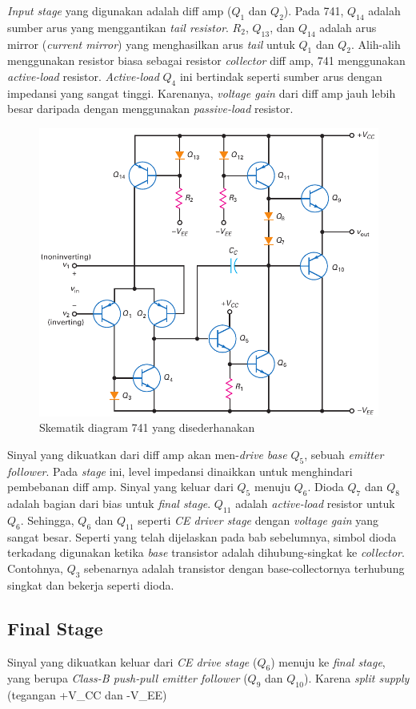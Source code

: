 \textit{Input stage} yang digunakan adalah diff amp ($ Q_1 $ dan $ Q_2 $). Pada 741, $ Q_{14} $ adalah sumber arus yang menggantikan \textit{tail resistor}. $ R_2 $, $ Q_{13} $, dan $ Q_{14} $ adalah arus mirror (\textit{current mirror}) yang menghasilkan arus \textit{tail} untuk $ Q_1 $ dan $ Q_2 $. Alih-alih menggunakan resistor biasa sebagai resistor \textit{collector} diff amp, 741 menggunakan \textit{active-load} resistor. \textit{Active-load} $ Q_4 $ ini bertindak seperti sumber arus dengan impedansi yang sangat tinggi. Karenanya, \textit{voltage gain} dari diff amp jauh lebih besar daripada dengan menggunakan \textit{passive-load} resistor.

\begin{figure}
	\centering
	\includegraphics[width=\linewidth]{pic/fig:16.04}
	\caption{Skematik diagram 741 yang disederhanakan}
	\label{fig:16.04}
\end{figure}

Sinyal yang dikuatkan dari diff amp akan men-\textit{drive} \textit{base} $ Q_5 $, sebuah \textit{emitter follower}. Pada \textit{stage} ini, level impedansi dinaikkan untuk menghindari pembebanan diff amp. Sinyal yang keluar dari $ Q_5 $ menuju $ Q_6 $. Dioda $ Q_7 $ dan $ Q_8 $ adalah bagian dari bias untuk \textit{final stage}. $ Q_{11} $ adalah \textit{active-load} resistor untuk $ Q_6 $. Sehingga, $ Q_6 $ dan $ Q_{11} $ seperti \textit{CE driver stage} dengan \textit{voltage gain} yang sangat besar. Seperti yang telah dijelaskan pada bab sebelumnya, simbol dioda terkadang digunakan ketika \textit{base} transistor adalah dihubung-singkat ke \textit{collector}. Contohnya, $ Q_3 $ sebenarnya adalah transistor dengan base-collectornya terhubung singkat dan bekerja seperti dioda.


\subsection{Final Stage}

Sinyal yang dikuatkan keluar dari \textit{CE drive stage} ($ Q_6 $) menuju ke \textit{final stage}, yang berupa \textit{Class-B push-pull emitter follower} ($ Q_9 $ dan $ Q_{10} $). Karena \textit{split supply} (tegangan +V_{CC} dan -V_{EE})